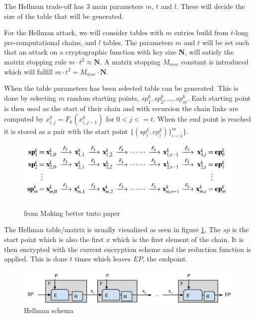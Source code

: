 The Hellman trade-off has 3 main parameters $m$, $t$ and $l$. These will
decide the size of the table that will be generated.

For the Hellman attack, we will consider tables with $m$ entries build
from $t$-long pre-computational chains, and $l$ tables. The parameters $m$ and $t$
will be set such that an attack on a cryptographic
function with key size \textbf{N}, will satisfy the matrix
stopping rule $m \cdot t^2 \approx \textbf{N}$. A matrix stopping $M_{msc}$
constant is introduced which will fulfill $m\cdot t^2 = M_{msc} \cdot
\textbf{N}$.

When the table parameters has been selected table can be generated. This is done
by selecting $m$ random starting points,
$sp^{k}_1,sp^{k}_2,...,sp^{k}_m$. Each starting point is then used as
the start of their chain and with recursion the chain links are
computed by $ x^{k}_{i,j}=F_k( x^{k}_{i,j-1})$ for $0<j<=t$. When the
end point is reached it is stored as a pair with the start point
$\{(sp^{k}_{i}, ep^{k}_{i})\}^{m}_{i=1}\}$.


\begin{figure}[th]
  \caption{from Making better tmto paper}
  \includegraphics[width=\textwidth]{figures/HellmanMatrix.png}
  \centering
  \label{fig:hellmax}
\end{figure}

The Hellman table/matrix is usually visualized as seen in figure \ref{fig:hellmax}.
The $sp$ is the start point which is also the first $x$ which is the first element of the chain. It is then encrypted with the current encryption scheme and the reduction function is applied. This is done $t$ times which leaves $EP$, the endpoint.

\begin{figure}[th]
  \centering
  \includegraphics[width=\textwidth]{figures/HellSchema.png}
  \caption{Hellman schema}
  \label{fig:hellSchema}
\end{figure}

